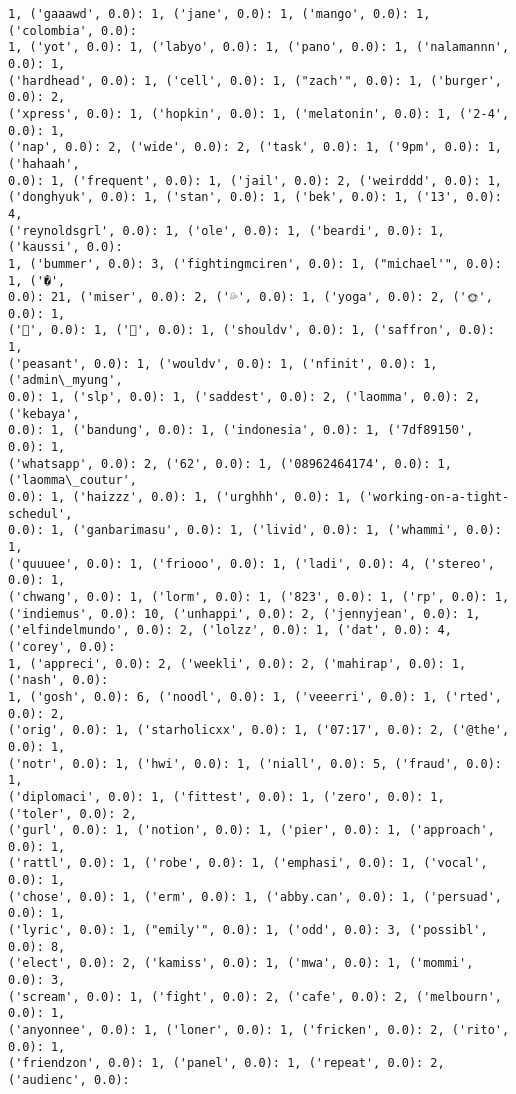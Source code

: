 \documentclass[11pt]{article}
\begin{document}
\begin{Verbatim}[commandchars=\\\{\}]
1, ('gaaawd', 0.0): 1, ('jane', 0.0): 1, ('mango', 0.0): 1, ('colombia', 0.0):
1, ('yot', 0.0): 1, ('labyo', 0.0): 1, ('pano', 0.0): 1, ('nalamannn', 0.0): 1,
('hardhead', 0.0): 1, ('cell', 0.0): 1, ("zach'", 0.0): 1, ('burger', 0.0): 2,
('xpress', 0.0): 1, ('hopkin', 0.0): 1, ('melatonin', 0.0): 1, ('2-4', 0.0): 1,
('nap', 0.0): 2, ('wide', 0.0): 2, ('task', 0.0): 1, ('9pm', 0.0): 1, ('hahaah',
0.0): 1, ('frequent', 0.0): 1, ('jail', 0.0): 2, ('weirddd', 0.0): 1,
('donghyuk', 0.0): 1, ('stan', 0.0): 1, ('bek', 0.0): 1, ('13', 0.0): 4,
('reynoldsgrl', 0.0): 1, ('ole', 0.0): 1, ('beardi', 0.0): 1, ('kaussi', 0.0):
1, ('bummer', 0.0): 3, ('fightingmciren', 0.0): 1, ("michael'", 0.0): 1, ('�',
0.0): 21, ('miser', 0.0): 2, ('💦', 0.0): 1, ('yoga', 0.0): 2, ('🌞', 0.0): 1,
('💃', 0.0): 1, ('🏽', 0.0): 1, ('shouldv', 0.0): 1, ('saffron', 0.0): 1,
('peasant', 0.0): 1, ('wouldv', 0.0): 1, ('nfinit', 0.0): 1, ('admin\_myung',
0.0): 1, ('slp', 0.0): 1, ('saddest', 0.0): 2, ('laomma', 0.0): 2, ('kebaya',
0.0): 1, ('bandung', 0.0): 1, ('indonesia', 0.0): 1, ('7df89150', 0.0): 1,
('whatsapp', 0.0): 2, ('62', 0.0): 1, ('08962464174', 0.0): 1, ('laomma\_coutur',
0.0): 1, ('haizzz', 0.0): 1, ('urghhh', 0.0): 1, ('working-on-a-tight-schedul',
0.0): 1, ('ganbarimasu', 0.0): 1, ('livid', 0.0): 1, ('whammi', 0.0): 1,
('quuuee', 0.0): 1, ('friooo', 0.0): 1, ('ladi', 0.0): 4, ('stereo', 0.0): 1,
('chwang', 0.0): 1, ('lorm', 0.0): 1, ('823', 0.0): 1, ('rp', 0.0): 1,
('indiemus', 0.0): 10, ('unhappi', 0.0): 2, ('jennyjean', 0.0): 1,
('elfindelmundo', 0.0): 2, ('lolzz', 0.0): 1, ('dat', 0.0): 4, ('corey', 0.0):
1, ('appreci', 0.0): 2, ('weekli', 0.0): 2, ('mahirap', 0.0): 1, ('nash', 0.0):
1, ('gosh', 0.0): 6, ('noodl', 0.0): 1, ('veeerri', 0.0): 1, ('rted', 0.0): 2,
('orig', 0.0): 1, ('starholicxx', 0.0): 1, ('07:17', 0.0): 2, ('@the', 0.0): 1,
('notr', 0.0): 1, ('hwi', 0.0): 1, ('niall', 0.0): 5, ('fraud', 0.0): 1,
('diplomaci', 0.0): 1, ('fittest', 0.0): 1, ('zero', 0.0): 1, ('toler', 0.0): 2,
('gurl', 0.0): 1, ('notion', 0.0): 1, ('pier', 0.0): 1, ('approach', 0.0): 1,
('rattl', 0.0): 1, ('robe', 0.0): 1, ('emphasi', 0.0): 1, ('vocal', 0.0): 1,
('chose', 0.0): 1, ('erm', 0.0): 1, ('abby.can', 0.0): 1, ('persuad', 0.0): 1,
('lyric', 0.0): 1, ("emily'", 0.0): 1, ('odd', 0.0): 3, ('possibl', 0.0): 8,
('elect', 0.0): 2, ('kamiss', 0.0): 1, ('mwa', 0.0): 1, ('mommi', 0.0): 3,
('scream', 0.0): 1, ('fight', 0.0): 2, ('cafe', 0.0): 2, ('melbourn', 0.0): 1,
('anyonnee', 0.0): 1, ('loner', 0.0): 1, ('fricken', 0.0): 2, ('rito', 0.0): 1,
('friendzon', 0.0): 1, ('panel', 0.0): 1, ('repeat', 0.0): 2, ('audienc', 0.0):

\end{Verbatim}
\end{document}
